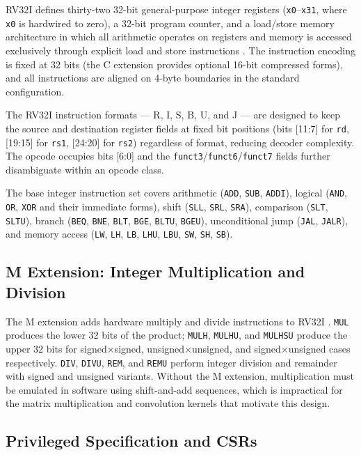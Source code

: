 RV32I defines thirty-two 32-bit general-purpose integer registers (\texttt{x0}--\texttt{x31},
where \texttt{x0} is hardwired to zero), a 32-bit program counter, and a load/store
memory architecture in which all arithmetic operates on registers and memory is
accessed exclusively through explicit load and store instructions \cite{riscv-spec-2019}.
The instruction encoding is fixed at 32 bits (the C extension provides optional 16-bit
compressed forms), and all instructions are aligned on 4-byte boundaries in the
standard configuration.

The RV32I instruction formats --- R, I, S, B, U, and J --- are designed to keep the
source and destination register fields at fixed bit positions (bits [11:7] for \texttt{rd},
[19:15] for \texttt{rs1}, [24:20] for \texttt{rs2}) regardless of format, reducing
decoder complexity. The opcode occupies bits [6:0] and the \texttt{funct3}/\texttt{funct6}/\texttt{funct7}
fields further disambiguate within an opcode class.

The base integer instruction set covers arithmetic (\texttt{ADD}, \texttt{SUB},
\texttt{ADDI}), logical (\texttt{AND}, \texttt{OR}, \texttt{XOR} and their immediate
forms), shift (\texttt{SLL}, \texttt{SRL}, \texttt{SRA}), comparison (\texttt{SLT},
\texttt{SLTU}), branch (\texttt{BEQ}, \texttt{BNE}, \texttt{BLT}, \texttt{BGE},
\texttt{BLTU}, \texttt{BGEU}), unconditional jump (\texttt{JAL}, \texttt{JALR}),
and memory access (\texttt{LW}, \texttt{LH}, \texttt{LB}, \texttt{LHU}, \texttt{LBU},
\texttt{SW}, \texttt{SH}, \texttt{SB}).

\subsection{M Extension: Integer Multiplication and Division}

The M extension adds hardware multiply and divide instructions to RV32I
\cite{riscv-spec-2019}. \texttt{MUL} produces the lower 32 bits of the product;
\texttt{MULH}, \texttt{MULHU}, and \texttt{MULHSU} produce the upper 32 bits for
signed$\times$signed, unsigned$\times$unsigned, and signed$\times$unsigned cases
respectively. \texttt{DIV}, \texttt{DIVU}, \texttt{REM}, and \texttt{REMU} perform
integer division and remainder with signed and unsigned variants. Without the M
extension, multiplication must be emulated in software using shift-and-add sequences,
which is impractical for the matrix multiplication and convolution kernels that motivate
this design.

\subsection{Privileged Specification and CSRs}

